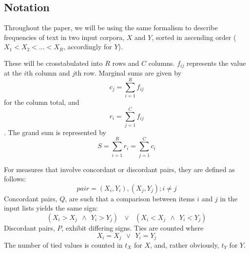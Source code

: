 \documentclass[11pt]{article}
\begin{document}
\subsection{Notation}
Throughout the paper, we will be using the same formalism to describe frequencies of text in two input corpora, $X$ and $Y$, sorted in ascending order ($X_1 < X_2 < ... < X_R$, accordingly for $Y$).

These will be crosstabulated into $R$ rows and $C$ columns.  $f_{ij}$ represents the value at the $i$th column and $j$th row.  Marginal sums are given by 
$$ c_j = \sum_{i=1}^{R}f_{ij} $$ for the column total, and $$ r_i = \sum_{j=1}^{C}f_{ij} $$.  The grand sum is represented by $$S = \sum_{i=1}^{R}r_i = \sum_{j=1}^{C}c_i $$

For measures that involve concordant or discordant pairs, they are defined as follows:
$$
pair = (X_i, Y_i), (X_j, Y_j); i \neq j
$$
Concordant pairs, $Q$, are such that a comparison between items $i$ and $j$ in the input lists yields the same sign:
$$
(X_i > X_j ~~\wedge~~ Y_i > Y_j)
~~~ \vee ~~~
(X_i < X_j ~~\wedge~~ Y_i < Y_j)
$$
Discordant pairs, $P$, exhibit differing signs.  Ties are counted where
$$
X_i = X_j ~~\vee~~ Y_i = Y_j
$$
The number of tied values is counted in $t_X$ for $X$, and, rather obviously, $t_Y$ for $Y$.



\end{document}
